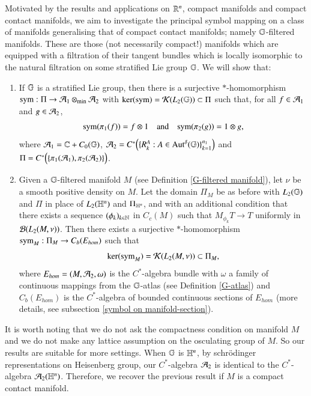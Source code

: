 \documentclass[leqno]{amsart}
\begin{document}
	
	
	Motivated by the results and applications on $\mathbb{R}^{n}$, compact manifolds and compact contact manifolds, we aim to investigate the principal symbol mapping on a class of manifolds generalising that of compact contact manifolds; namely $\mathbb{G}$-filtered manifolds. These are those (not necessarily compact!) manifolds which are equipped with a filtration of their tangent bundles which is locally isomorphic to the natural filtration on some stratified Lie group $\mathbb{G}$. We will show that:
	\begin{enumerate}[\rm(i)]
		\item If $\mathbb{G}$ is a stratified Lie group,
		then there is a surjective $*$-homomorphism ${\rm sym}:\Pi\rightarrow{\mathcal A}_{1}\otimes_{\rm min}{\mathcal A}_{2}$ with $\ker({\rm sym})={\mathcal K}(L_{2}(\mathbb{G}))\subset\Pi$ such that, for all $f\in{\mathcal A}_{1}$ and $g\in{\mathcal A}_{2}$,
		\begin{align*}
			{\rm sym}(\pi_{1}(f))=f\otimes1\quad\text{and}\quad{\rm sym}(\pi_{2}(g))=1\otimes g,
		\end{align*}
		where ${\mathcal A}_{1}=\mathbb{C}+C_0(\mathbb{G})$, ${\mathcal A}_{2}=C^{*}\Big(\{{ R}^{A}_{k}:A\in{\rm Aut^{\delta}}(\mathbb{G})\}_{k=1}^{n_{1}}\Big)$ and $\Pi=C^{*}\Big(\{\pi_{1}({\mathcal A}_{1}),\pi_{2}({\mathcal A}_{2})\}\Big)$.
		
		
		\item Given a $\mathbb{G}$-filtered manifold $M$ (see Definition \ref{G-filtered manifold}), %
		let $\nu$ be a smooth positive density on $M$.  Let the domain $\Pi_{M}$ be as before with $L_{2}(\mathbb{G})$ and $\Pi$ in place of $L_{2}(\mathbb{H}^{n})$ and $\Pi_{\mathbb{H}^{n}}$, and with an additional condition that there exists a sequence $(\phi_k)_{k\in\mathbb{N}}$ in $C_c(M)$ such that $M_{\phi_k}T\to T$ uniformly in ${\mathcal B}(L_{2}(M,\nu))$. 
		Then there exists a surjective $*$-homomorphism ${\rm sym}_{M}:\Pi_{M}\to C_{b}(E_{hom})$ such that $$\ker({\rm sym}_{M})={\mathcal K}(L_{2}(M,\nu))\subset\Pi_{M},$$
		where $E_{hom}=(M,{\mathcal A}_{2},\omega)$ is the $C^{*}$-algebra bundle with $\omega$ a family of continuous mappings from the $\mathbb{G}$-atlas (see Definition \ref{G-atlas}) and $C_{b}(E_{hom})$  is the $C^{*}$-algebra of bounded continuous sections of $E_{hom}$ (more details, see subsection \ref{symbol on manifold-section}).
	\end{enumerate}
	It is worth noting that we do not ask the compactness condition on manifold $M$ and we do not make any lattice assumption on the osculating group of $M$. So our results are suitable for more settings. When $\mathbb{G}$ is $\mathbb{H}^{n}$, by schr\"{o}dinger representations on Heisenberg group, our $C^{*}$-algebra ${\mathcal A}_{2}$ is identical to the $C^{*}$-algebra ${\mathcal A}_{2}(\mathbb{H}^{n})$. Therefore, we recover the previous result if $M$ is a compact contact manifold.
	
\end{document}
